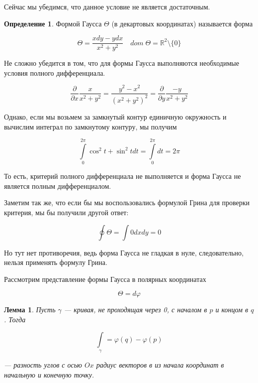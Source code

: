 \documentclass[a5paper]{article}
\newcounter{through}
\theoremstyle{plain}
\newtheorem{lemma}[through]{Лемма}
\theoremstyle{definition}
\newtheorem{definition}[through]{Определение}
\numberwithin{through}{section}
\numberwithin{equation}{section}
\begin{document}
Сейчас мы убедимся, что данное условие не является достаточным.

\begin{definition}
	Формой Гаусса $\Theta$ (в декартовых координатах) называется форма
	
	\begin{equation*}
		\Theta = \frac{xdy - ydx}{x^2 + y^2} \quad dom \; \Theta = \mathbb{R}^2 \setminus \{0\}
	\end{equation*}	
\end{definition}

Не сложно убедится в том, что для формы Гаусса выполняются необходимые условия полного дифференциала.

\begin{equation*}
	\frac{\partial}{\partial x} \frac{x}{x^2 + y^2} = \frac{y^2 - x^2}{(x^2 + y^2)^2} = \frac{\partial}{\partial y} \frac{-y}{x^2 + y^2}
\end{equation*}

Однако, если мы возьмем за замкнутый контур единичную окружность и вычислим интеграл по замкнутому контуру, мы получим

\begin{equation*}
	\int\limits_{0}^{2 \pi} \cos^2 t+ \sin^2 t dt = \int\limits_{0}^{2 \pi }dt = 2 \pi
\end{equation*}

То есть, критерий полного дифференциала не выполняется и форма Гаусса не является полным дифференциалом.

Заметим так же, что если бы мы воспользовались формулой Грина для проверки критерия, мы бы получили другой ответ:

\begin{equation*}
	\oint\limits \Theta = \int 0 dx dy = 0
\end{equation*}

Но тут нет противоречия, ведь форма Гаусса не гладкая в нуле, следовательно, нельзя применять формулу Грина. 

Рассмотрим представление формы Гаусса в полярных координатах

\begin{equation*}
	\Theta = d \varphi
\end{equation*}

\begin{lemma}
	Пусть $\gamma$ --- кривая, не проходящая через 0, с началом в $p$ и концом в $q$. Тогда 
	
	\begin{equation*}
		\int\limits_{\gamma} = \varphi(q) - \varphi(p)
	\end{equation*}
	
	--- разность углов с осью $Ox$ радиус векторов в из начала координат в начальную и конечную точку.
\end{lemma} 
\end{document}
